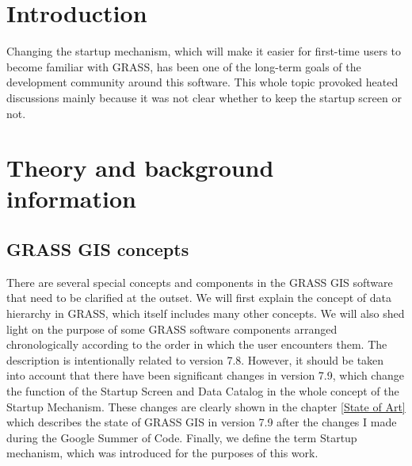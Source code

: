 \documentclass[a4paper,10pt,twoside]{article}
\begin{document}
\section*{Introduction}
\large
\setcounter{page}{13}  %





Changing the startup mechanism, which will make it easier for first-time users to become familiar with GRASS, has been one of the long-term goals of the development community around this software. This whole topic provoked heated discussions mainly because it was not clear whether to keep the startup screen or not.




\newpage
\vspace*{-1cm}
\section{Theory and background information}
\label{section:explanation}



\subsection{GRASS GIS concepts}
\noindent There are several special concepts and components in the GRASS GIS software that need to be clarified at the outset. We will first explain the concept of data hierarchy in GRASS, which itself includes many other concepts. We will also shed light on the purpose of some GRASS software components arranged chronologically according to the order in which the user encounters them. The description is intentionally related to version 7.8. However, it should be taken into account that there have been significant changes in version 7.9, which change the function of the Startup Screen and Data Catalog in the whole concept of the Startup Mechanism. These changes are clearly shown in the chapter \ref{State of Art} which describes the state of GRASS GIS in version 7.9 after the changes I made during the Google Summer of Code.
Finally, we define the term Startup mechanism, which was introduced for the purposes of this work.
\end{document}

